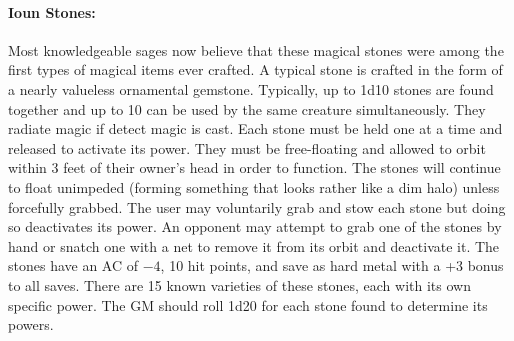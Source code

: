 \begin{multicols}{2}
\paragraph{Ioun Stones:} Most knowledgeable sages now believe that these magical stones were among the first types of magical items ever crafted.  A typical stone is crafted in the form of a nearly valueless ornamental gemstone.  Typically, up to 1d10 stones are found together and up to 10 can be used by the same creature simultaneously.  They radiate magic if detect magic is cast.  Each stone must be held one at a time and released to activate its power.  They must be free-floating and allowed to orbit within 3 feet of their owner's head in order to function.  The stones will continue to float unimpeded (forming something that looks rather like a dim halo) unless forcefully grabbed.  The user may voluntarily grab and stow each stone but doing so deactivates its power.  An opponent may attempt to grab one of the stones by hand or snatch one with a net to remove it from its orbit and deactivate it.  The stones have an AC of $-4$, 10 hit points, and save as hard metal with a +3 bonus to all saves.  There are 15 known varieties of these stones, each with its own specific power.  The GM should roll 1d20 for each stone found to determine its powers.


\end{multicols}
